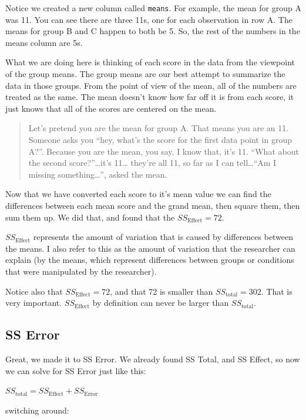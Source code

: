 \documentclass[
  letterpaper,
  DIV=11,
  numbers=noendperiod]{scrreprt}
\begin{document}
Notice we created a new column called \texttt{means}. For example, the
mean for group A was 11. You can see there are three 11s, one for each
observation in row A. The means for group B and C happen to both be 5.
So, the rest of the numbers in the means column are 5s.

What we are doing here is thinking of each score in the data from the
viewpoint of the group means. The group means are our best attempt to
summarize the data in those groups. From the point of view of the mean,
all of the numbers are treated as the same. The mean doesn't know how
far off it is from each score, it just knows that all of the scores are
centered on the mean.

\begin{quote}
Let's pretend you are the mean for group A. That means you are an 11.
Someone asks you ``hey, what's the score for the first data point in
group A?''. Because you are the mean, you say, I know that, it's 11.
``What about the second score?''\ldots it's 11\ldots{} they're all 11,
so far as I can tell\ldots{}``Am I missing something\ldots{}'', asked
the mean.
\end{quote}

Now that we have converted each score to it's mean value we can find the
differences between each mean score and the grand mean, then square
them, then sum them up. We did that, and found that the
\(SS_\text{Effect} = 72\).

\(SS_\text{Effect}\) represents the amount of variation that is caused
by differences between the means. I also refer to this as the amount of
variation that the researcher can explain (by the means, which represent
differences between groups or conditions that were manipulated by the
researcher).

Notice also that \(SS_\text{Effect} = 72\), and that 72 is smaller than
\(SS_\text{total} = 302\). That is very important. \(SS_\text{Effect}\)
by definition can never be larger than \(SS_\text{total}\).

\subsection{SS Error}\label{ss-error}

Great, we made it to SS Error. We already found SS Total, and SS Effect,
so now we can solve for SS Error just like this:

\(SS_\text{total} = SS_\text{Effect} + SS_\text{Error}\)

switching around:
\end{document}
